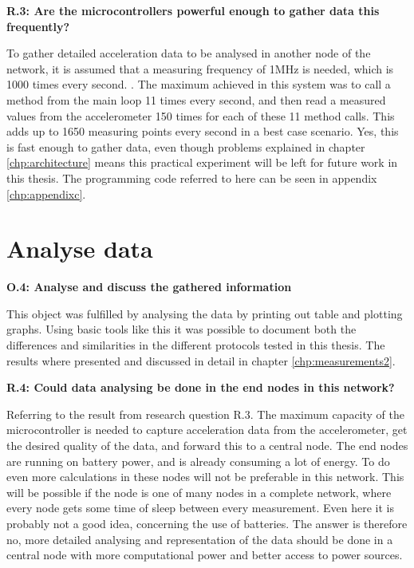 \noindent\textbf{R.3: Are the microcontrollers powerful enough to gather data this frequently?}

To gather detailed acceleration data to be analysed in another node of the network, it is assumed that a measuring frequency of 1MHz is needed, which is 1000 times every second. . The maximum achieved in this system was to call a method from the main loop 11 times every second, and then read a measured values from the accelerometer 150 times for each of these 11 method calls. This adds up to 1650 measuring points every second in a best case scenario. Yes, this is fast enough to gather data, even though problems explained in chapter \ref{chp:architecture} means this practical experiment will be left for future work in this thesis. The programming code referred to here can be seen in appendix \ref{chp:appendixc}. 


\section{Analyse data}

\noindent\textbf{O.4: Analyse and discuss the gathered information}

This object was fulfilled by analysing the data by printing out table and plotting graphs. Using basic tools like this it was possible to document both the differences and similarities in the different protocols tested in this thesis. The results where presented and discussed in detail in chapter \ref{chp:measurements2}.

\noindent\textbf{R.4: Could data analysing be done in the end nodes in this network?}

Referring to the result from research question R.3. The maximum capacity of the \gls{microcontroller} is needed to capture acceleration data from the accelerometer, get the desired quality of the data, and forward this to a central node. The end nodes are running on battery power, and is already consuming a lot of energy. To do even more calculations in these nodes will not be preferable in this network. This will be possible if the node is one of many nodes in a complete network, where every node gets some time of sleep between every measurement. Even here it is probably not a good idea, concerning the use of batteries. The answer is therefore no, more detailed analysing and representation of the data should be done in a central node with more computational power and better access to power sources. 

\newpage
